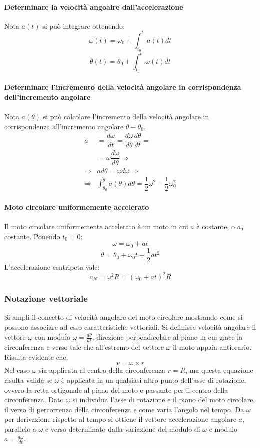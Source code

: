 			\paragraph{Determinare la velocit\`a angoalre dall'accelerazione}
			Nota $a(t)$ si pu\`o integrare ottenendo:
			$$\omega(t)=\omega_0+\int_{t_0}^ta(t)dt$$
			$$\theta(t)=\theta_0+\int_{t_0}^t\omega(t)dt$$

			\paragraph{Determinare l'incremento della velocit\`a angolare in corrispondenza dell'incremento angolare}
			Nota $a(\theta)$ si pu\`o calcolare l'incremento della velocit\`a angolare in corrispondenza all'incremento angolare $\theta-\theta_0$.
			\begin{align*}
				a&=\dfrac{d\omega}{dt}=\dfrac{d\omega}{d\theta}\dfrac{d\theta}{dt}=\\
				 &=\omega\dfrac{d\omega}{d\theta}\Rightarrow\\
				\Rightarrow&ad\theta=\omega d\omega\Rightarrow\\
				\Rightarrow&\int_{\theta_0}^\theta a(\theta)d\theta=\dfrac{1}{2}\omega^2-\dfrac{1}{2}\omega_0^2
			\end{align*}

			\paragraph{Moto circolare uniformemente accelerato}
			Il moto circolare uniformemente accelerato \`e un moto in cui $a$ \`e costante, o $a_T$ costante.
			Ponendo $t_0=0$:
			$$\omega=\omega_0+at$$
			$$\theta=\theta_0+\omega_0t+\dfrac{1}{2}at^2$$
			L'accelerazione centripeta vale:
			$$a_N=\omega^2R=(\omega_0+at)^2R$$

		\subsubsection{Notazione vettoriale}
		Si ampli il concetto di velocit\`a angolare del moto circolare mostrando come si possono associare ad esso caratteristiche vettoriali.
		Si definisce velocit\`a angolare il vettore $\omega$ con modulo $\omega=\frac{d\theta}{dt}$, direzione perpendicolare al piano in cui giace la circonferenza e verso tale che all'estremo del vettore $\omega$ il moto appaia antiorario.
		Risulta evidente che:
		$$v=\omega\times r$$
		Nel caso $\omega$ sia applicata al centro della circonferenza $r=R$, ma questa equazione risulta valida se $\omega$ \`e applicata in un qualsiasi altro punto dell'asse di rotazione, ovvero la retta ortigonale al piano del moto e passante per il centro della circonferenza.
		Dato $\omega$ si individua l'asse di rotazione e il piano del moto circolare, il verso di percorrenza della circonferenza e come varia l'angolo nel tempo.
		Da $\omega$ per derivazione rispetto al tempo si ottiene il vettore accelerazione angolare $a$, parallelo a $\omega$ e verso determinato dalla variazione del modulo di $\omega$ e modulo $a=\frac{d\omega}{dt}$.

